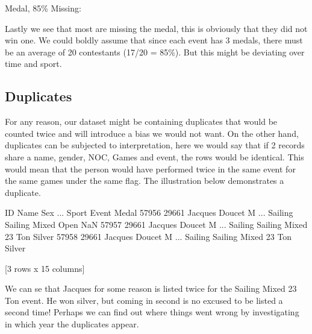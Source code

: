 \documentclass[letterpaper,10pt,english]{jupyterBook}
\begin{document}
\sphinxAtStartPar
Medal, 85\% Missing:

\sphinxAtStartPar
Lastly we see that most are missing the medal, this is obviously that they did not win one. We could boldly assume that since each event has 3 medals, there must be an average of 20 contestants (17/20 = 85\%). But this might be deviating over time and sport.


\subsection{Duplicates}
\label{\detokenize{c7_case_studies/Olympics:duplicates}}
\sphinxAtStartPar
For any reason, our dataset might be containing duplicates that would be counted twice and will introduce a bias we would not want. On the other hand, duplicates can be subjected to interpretation, here we would say that if 2 records share a name, gender, NOC, Games and event, the rows would be identical.
This would mean that the person would have performed twice in the same event for the same games under the same flag. The illustration below demonstrates a duplicate.

\begin{sphinxVerbatim}[commandchars=\\\{\}]
\PYG{p}{[}  \PYG{p}{]}
\end{sphinxVerbatim}

\begin{sphinxVerbatim}[commandchars=\\\{\}]
          ID            Name Sex  ...    Sport                  Event   Medal
57956  29661  Jacques Doucet   M  ...  Sailing     Sailing Mixed Open     NaN
57957  29661  Jacques Doucet   M  ...  Sailing  Sailing Mixed 2\PYGZhy{}3 Ton  Silver
57958  29661  Jacques Doucet   M  ...  Sailing  Sailing Mixed 2\PYGZhy{}3 Ton  Silver

[3 rows x 15 columns]
\end{sphinxVerbatim}

\sphinxAtStartPar
We can se that Jacques for some reason is listed twice for the Sailing Mixed 2\sphinxhyphen{}3 Ton event. He won silver, but coming in second is no excused to be listed a second time! Perhaps we can find out where things went wrong by investigating in which year the duplicates appear.
\end{document}
